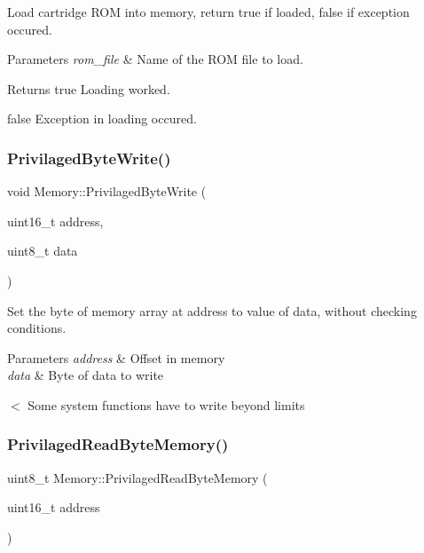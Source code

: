 Load cartridge R\+OM into memory, return true if loaded, false if exception occured. 


\begin{DoxyParams}{Parameters}
{\em rom\+\_\+file} & Name of the R\+OM file to load. \\
\hline
\end{DoxyParams}
\begin{DoxyReturn}{Returns}
true Loading worked. 

false Exception in loading occured. 
\end{DoxyReturn}
\mbox{\label{classMemory_a70a1de728fa4adac9b2da63c8434d909}} 
\subsubsection{\texorpdfstring{Privilaged\+Byte\+Write()}{PrivilagedByteWrite()}}
{\footnotesize\ttfamily void Memory\+::\+Privilaged\+Byte\+Write (\begin{DoxyParamCaption}\item[{uint16\+\_\+t}]{address,  }\item[{uint8\+\_\+t}]{data }\end{DoxyParamCaption})}



Set the byte of memory array at address to value of data, without checking conditions. 


\begin{DoxyParams}{Parameters}
{\em address} & Offset in memory \\
\hline
{\em data} & Byte of data to write \\
\hline
\end{DoxyParams}
$<$ Some system functions have to write beyond limits \mbox{\label{classMemory_a564d7bb2a8fc303f95af1a02756b882e}} 
\subsubsection{\texorpdfstring{Privilaged\+Read\+Byte\+Memory()}{PrivilagedReadByteMemory()}}
{\footnotesize\ttfamily uint8\+\_\+t Memory\+::\+Privilaged\+Read\+Byte\+Memory (\begin{DoxyParamCaption}\item[{uint16\+\_\+t}]{address }\end{DoxyParamCaption})}



